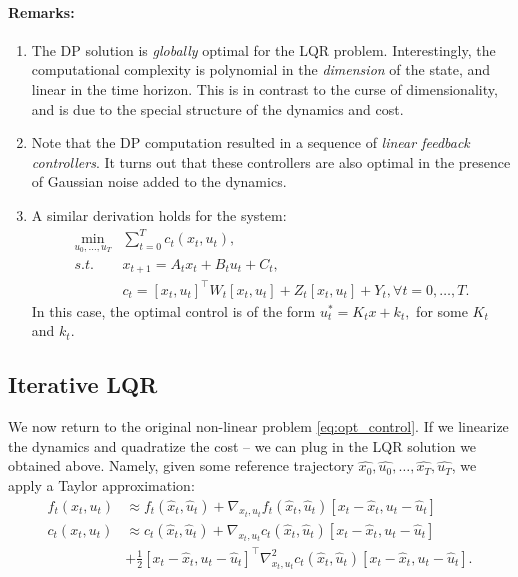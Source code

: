 \paragraph{Remarks:}
\begin{enumerate}
  \item The DP solution is \emph{globally} optimal for the LQR problem. Interestingly, the computational complexity is polynomial in the \textit{dimension} of the state, and linear in the time horizon. This is in contrast to the curse of dimensionality, and is due to the special structure of the dynamics and cost.
  \item Note that the DP computation resulted in a sequence of \textit{linear feedback controllers}. It turns out that these controllers are also optimal in the presence of Gaussian noise added to the dynamics.
  \item A similar derivation holds for the system:
  \begin{equation*}\label{eq:lqr_full}
    \begin{split}
        \min_{u_0,\dots,u_{T}} & \sum_{t=0}^T c_t(x_t, u_t), \\
        s.t. \quad & {x_{t + 1}} = A_t x_t + B_t u_t + C_t, \\
        & c_t = [x_t, u_t]^\top W_t [x_t, u_t] + Z_t [x_t, u_t] + Y_t, \forall t=0,\dots,T.
    \end{split}
\end{equation*}
In this case, the optimal control is of the form 
$u_t^* = K_t x + k_t, $ for some $K_t$ and $k_t$.
\end{enumerate}


\subsection{Iterative LQR}

We now return to the original non-linear problem \ref{eq:opt_control}. If we linearize the dynamics and quadratize the cost -- we can plug in the LQR solution we obtained above. Namely, given some reference trajectory $\hat{x_0},\hat{u_0},\dots,\hat{x_T}, \hat{u_T}$, we apply a Taylor approximation:
\begin{equation}\label{eq:Taylor_approx}
\begin{split}
    {f_t}({x_t},{u_t}) &\approx {f_t}({\hat{x}_t},{\hat{u}_t}) + \nabla_{x_t, u_t}f_t({\hat{x}_t},{\hat{u}_t}) [x_t - \hat{x}_t, u_t - \hat{u}_t] \\
    {c_t}({x_t},{u_t}) &\approx {c_t}({\hat{x}_t},{\hat{u}_t}) + \nabla_{x_t, u_t}c_t({\hat{x}_t},{\hat{u}_t}) [x_t - \hat{x}_t, u_t - \hat{u}_t] \\
    & + \frac{1}{2} [x_t - \hat{x}_t, u_t - \hat{u}_t]^\top \nabla^2_{x_t, u_t}c_t({\hat{x}_t},{\hat{u}_t}) [x_t - \hat{x}_t, u_t - \hat{u}_t].
\end{split}
\end{equation}

